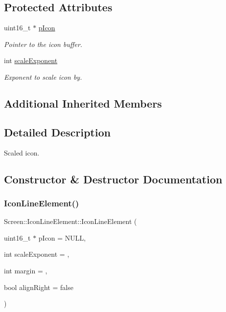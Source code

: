 \subsection*{Protected Attributes}
\begin{DoxyCompactItemize}
\item 
\mbox{\label{classScreen_1_1IconLineElement_ae84108a5bfda7ba013401c067a8c9aca}} 
uint16\+\_\+t $\ast$ \mbox{\hyperlink{classScreen_1_1IconLineElement_ae84108a5bfda7ba013401c067a8c9aca}{p\+Icon}}
\begin{DoxyCompactList}\small\item\em Pointer to the icon buffer. \end{DoxyCompactList}\item 
int \mbox{\hyperlink{classScreen_1_1IconLineElement_a95ab319fab5abe27266a092fdb75b58e}{scale\+Exponent}}
\begin{DoxyCompactList}\small\item\em Exponent to scale icon by. \end{DoxyCompactList}\end{DoxyCompactItemize}
\subsection*{Additional Inherited Members}


\subsection{Detailed Description}
Scaled icon. 

\subsection{Constructor \& Destructor Documentation}
\mbox{\label{classScreen_1_1IconLineElement_ad465a9f557b9f7e659ebfb8a5a995ca6}} 
\subsubsection{\texorpdfstring{Icon\+Line\+Element()}{IconLineElement()}\hspace{0.1cm}{\footnotesize\ttfamily [1/2]}}
{\footnotesize\ttfamily Screen\+::\+Icon\+Line\+Element\+::\+Icon\+Line\+Element (\begin{DoxyParamCaption}\item[{uint16\+\_\+t $\ast$}]{p\+Icon = {\ttfamily NULL},  }\item[{int}]{scale\+Exponent = {},  }\item[{int}]{margin = {},  }\item[{bool}]{align\+Right = {\ttfamily false} }\end{DoxyParamCaption})}



